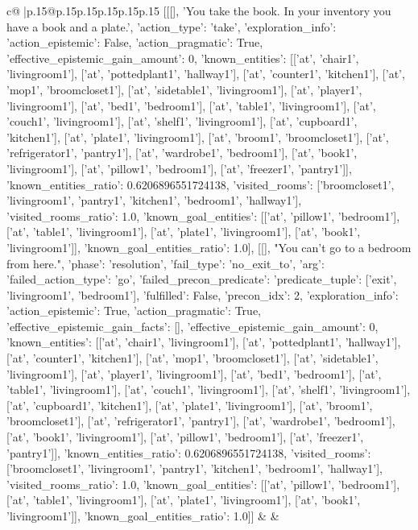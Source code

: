 \documentclass{article}
\begin{document}
{\begin{supertabular}{c@{$\;$}|p{.15\linewidth}@{}p{.15\linewidth}p{.15\linewidth}p{.15\linewidth}p{.15\linewidth}p{.15\linewidth}}
{{{	 [[[], 'You take the book. In your inventory you have a book and a plate.', {'action_type': 'take', 'exploration_info': {'action_epistemic': False, 'action_pragmatic': True, 'effective_epistemic_gain_amount': 0, 'known_entities': [['at', 'chair1', 'livingroom1'], ['at', 'pottedplant1', 'hallway1'], ['at', 'counter1', 'kitchen1'], ['at', 'mop1', 'broomcloset1'], ['at', 'sidetable1', 'livingroom1'], ['at', 'player1', 'livingroom1'], ['at', 'bed1', 'bedroom1'], ['at', 'table1', 'livingroom1'], ['at', 'couch1', 'livingroom1'], ['at', 'shelf1', 'livingroom1'], ['at', 'cupboard1', 'kitchen1'], ['at', 'plate1', 'livingroom1'], ['at', 'broom1', 'broomcloset1'], ['at', 'refrigerator1', 'pantry1'], ['at', 'wardrobe1', 'bedroom1'], ['at', 'book1', 'livingroom1'], ['at', 'pillow1', 'bedroom1'], ['at', 'freezer1', 'pantry1']], 'known_entities_ratio': 0.6206896551724138, 'visited_rooms': ['broomcloset1', 'livingroom1', 'pantry1', 'kitchen1', 'bedroom1', 'hallway1'], 'visited_rooms_ratio': 1.0, 'known_goal_entities': [['at', 'pillow1', 'bedroom1'], ['at', 'table1', 'livingroom1'], ['at', 'plate1', 'livingroom1'], ['at', 'book1', 'livingroom1']], 'known_goal_entities_ratio': 1.0}}], [[], "You can't go to a bedroom from here.", {'phase': 'resolution', 'fail_type': 'no_exit_to', 'arg': {'failed_action_type': 'go', 'failed_precon_predicate': {'predicate_tuple': ['exit', 'livingroom1', 'bedroom1'], 'fulfilled': False, 'precon_idx': 2}}, 'exploration_info': {'action_epistemic': True, 'action_pragmatic': True, 'effective_epistemic_gain_facts': [], 'effective_epistemic_gain_amount': 0, 'known_entities': [['at', 'chair1', 'livingroom1'], ['at', 'pottedplant1', 'hallway1'], ['at', 'counter1', 'kitchen1'], ['at', 'mop1', 'broomcloset1'], ['at', 'sidetable1', 'livingroom1'], ['at', 'player1', 'livingroom1'], ['at', 'bed1', 'bedroom1'], ['at', 'table1', 'livingroom1'], ['at', 'couch1', 'livingroom1'], ['at', 'shelf1', 'livingroom1'], ['at', 'cupboard1', 'kitchen1'], ['at', 'plate1', 'livingroom1'], ['at', 'broom1', 'broomcloset1'], ['at', 'refrigerator1', 'pantry1'], ['at', 'wardrobe1', 'bedroom1'], ['at', 'book1', 'livingroom1'], ['at', 'pillow1', 'bedroom1'], ['at', 'freezer1', 'pantry1']], 'known_entities_ratio': 0.6206896551724138, 'visited_rooms': ['broomcloset1', 'livingroom1', 'pantry1', 'kitchen1', 'bedroom1', 'hallway1'], 'visited_rooms_ratio': 1.0, 'known_goal_entities': [['at', 'pillow1', 'bedroom1'], ['at', 'table1', 'livingroom1'], ['at', 'plate1', 'livingroom1'], ['at', 'book1', 'livingroom1']], 'known_goal_entities_ratio': 1.0}}]] 
	  } 
	   } 
	   } 
	 & & \\ 
 


\end{supertabular}}
\end{document}
